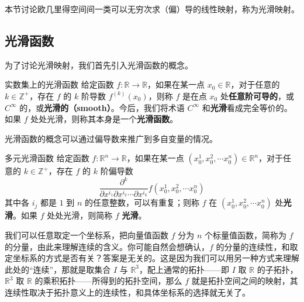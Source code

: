 


本节讨论欧几里得空间间一类可以无穷次求（偏）导的线性映射，称为光滑映射。

\subsection{光滑函数}

为了讨论光滑映射，我们首先引入光滑函数的概念。

\begin{definition}{实数集上的光滑函数}
给定函数 $f:\mathbb{R}\rightarrow\mathbb{R}$，如果在某一点 $x_0\in\mathbb{R}$，对于任意的 $k\in\mathbb{Z}^+$，存在 $f$ 的 $k$ 阶导数 $f^{(k)}(x_0)$，则称 $f$ 是在点 $x_0$ 处\textbf{任意阶可导的}，或 $C^\infty$ 的，或\textbf{光滑的（smooth）}。今后，我们将术语 $C^{\infty}$ 和\textbf{光滑}看成完全等价的。如果 $f$ 处处光滑，则称其本身是一个\textbf{光滑函数}。
\end{definition}

光滑函数的概念可以通过偏导数来推广到多自变量的情况。

\begin{definition}{多元光滑函数}
给定函数 $f:\mathbb{R}^n\rightarrow\mathbb{R}$，如果在某一点 $(x_0^1, x_0^2, \cdots x_0^n) \in\mathbb{R}^n$，对于任意的 $k\in\mathbb{Z}^+$，存在 $f$ 的 $k$ 阶偏导数$$\frac{\partial^k}{\partial x^{i_1}\partial x^{i_2}\cdots\partial x^{i_k}}f(x_0^1, x_0^2, \cdots x_0^n)$$其中各 $i_j$ 都是 $1$ 到 $n$ 的任意整数，可以有重复；则称 $f$ 在 $(x_0^1, x_0^2, \cdots x_0^n)$ 处\textbf{光滑}。如果 $f$ 处处光滑，则简称 $f$ \textbf{光滑}。
\end{definition}

我们可以任意取定一个坐标系，把向量值函数 $f$ 分为 $n$ 个标量值函数，简称为 $f$ 的分量，由此来理解连续的含义。你可能自然会想确认，$f$ 的分量的连续性，和取定坐标系的方式是否有关？答案是无关的。这是因为我们可以用另一种方式来理解此处的“连续”，那就是取集合 $I$ 与 $\mathbb{R}^3$，配上通常的拓扑——即 $I$ 取 $\mathbb{R}$ 的子拓扑，$\mathbb{R}^3$ 取 $\mathbb{R}$ 的乘积拓扑——所得到的拓扑空间，那么 $f$ 就是拓扑空间之间的映射，其连续性取决于拓扑意义上的连续性，和具体坐标系的选择就无关了。

